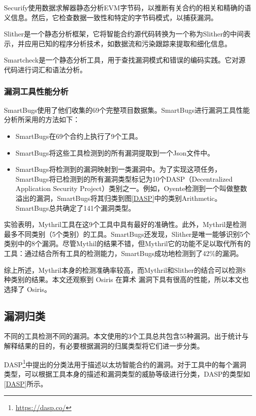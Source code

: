 Securify\cite{securify}使用数据求解器静态分析EVM字节码，以推断有关合约的相关和精确的语义信息。然后，它检查数据一致性和特定的字节码模式，以捕获漏洞。

Slither\cite{Slither}是一个静态分析框架，它将智能合约源代码转换为一个称为Slither的中间表示，并应用已知的程序分析技术，如数据流和污染跟踪来提取和细化信息。

Smartcheck\cite{smartembed}是一个静态分析工具，用于查找漏洞模式和错误的编码实践。它对源代码进行词汇和语法分析。

\subsubsection{漏洞工具性能分析}

SmartBugs使用了他们收集的69个完整项目数据集。SmartBugs进行漏洞工具性能分析所采用的方法如下：
\begin{itemize}
    \item [1.]SmartBugs在69个合约上执行了9个工具。
    \item [2.]SmartBugs将这些工具检测到的所有漏洞提取到一个Json文件中。
    \item [3.]SmartBugs将检测到的漏洞映射到一类漏洞中。为了实现这项任务，SmartBugs将已检测到的所有漏洞类型标记为10个DASP（Decentralized Application Security Project）类别之一。例如，Oyente检测到一个叫做整数溢出的漏洞，SmartBugs将其归类到图\ref{DASP}中的类别Arithmetic。SmartBugs总共确定了141个漏洞类型。
\end{itemize}

实验表明，Mythril工具在这9个工具中具有最好的准确性。此外，Mythril是检测最多不同类别（5个类别）的工具。SmartBugs还发现，Slither是唯一能够识别5个类别中的8个漏洞。尽管Mythil的结果不错，但Mythril它的功能不足以取代所有的工具：通过结合所有工具的检测能力，SmartBugs成功地检测到了42\%的漏洞。

综上所述，Mythril本身的检测准确率较高，而Mythril和Slither的结合可以检测8种类别的结果。本文还观察到 Osiris 在算术 漏洞下具有很高的性能，所以本文也选择了 Osiris。

\subsection{漏洞归类}

不同的工具检测不同的漏洞。本文使用的3个工具总共包含55种漏洞。出于统计与解释结果的目的，有必要根据漏洞的归属类型将它们进一步分类。

 DASP\footnote{\url{https://dasp.co/}}中提出的分类法用于描述以太坊智能合约的漏洞。对于工具中的每个漏洞类型，可以根据工具本身的描述和漏洞类型的威胁等级进行分类，DASP的类型如\ref{DASP}所示。

